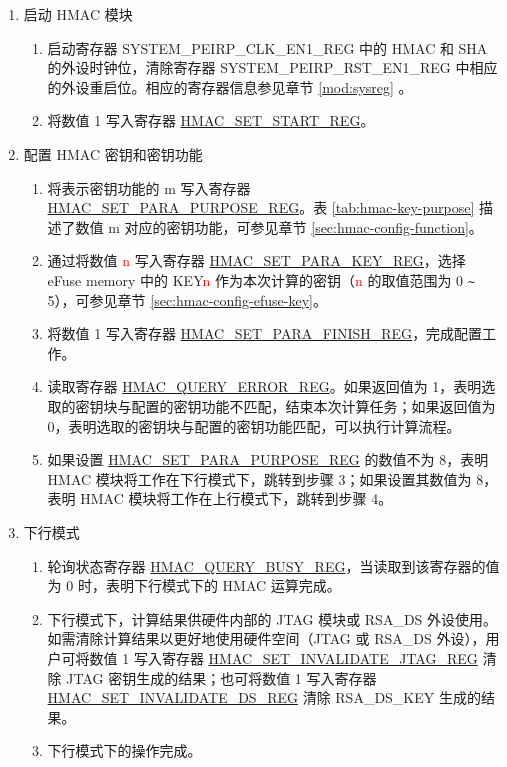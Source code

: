 \documentclass[main\_\_CN.tex]{subfiles}
\begin{document}
\begin{enumerate}
    \item 启动 HMAC 模块
    \begin{enumerate}
        \item 启动寄存器 SYSTEM\_PEIRP\_CLK\_EN1\_REG 中的 HMAC 和 SHA 的外设时钟位，清除寄存器 SYSTEM\_PEIRP\_RST\_EN1\_REG 中相应的外设重启位。相应的寄存器信息参见章节 \ref{mod:sysreg} \textit{}。
        \item 将数值 1 写入寄存器 \hyperref[regdesc:HMACSETSTARTREG]{HMAC\_SET\_START\_REG}。
    \end{enumerate}

    \item 配置 HMAC 密钥和密钥功能
        \begin{enumerate}
            \item 将表示密钥功能的 m 写入寄存器 \hyperref[regdesc:HMACSETPARAPURPOSEREG]{HMAC\_SET\_PARA\_PURPOSE\_REG}。表 \ref{tab:hmac-key-purpose} 描述了数值 m 对应的密钥功能，可参见章节 \ref{sec:hmac-config-function}。
            \item 通过将数值 \textcolor{red}{n} 写入寄存器 \hyperref[regdesc:HMACSETPARAKEYREG]{HMAC\_SET\_PARA\_KEY\_REG}，选择 eFuse memory 中的 KEY\textcolor{red}{n} 作为本次计算的密钥（\textcolor{red}{n} 的取值范围为 0 \verb+~+ 5），可参见章节 \ref{sec:hmac-config-efuse-key}。
            \item 将数值 1 写入寄存器 \hyperref[regdesc:HMACSETPARAFINISHREG]{HMAC\_SET\_PARA\_FINISH\_REG}，完成配置工作。
            \item 读取寄存器 \hyperref[regdesc:HMACQUERYERRORREG]{HMAC\_QUERY\_ERROR\_REG}。如果返回值为 1，表明选取的密钥块与配置的密钥功能不匹配，结束本次计算任务；如果返回值为 0，表明选取的密钥块与配置的密钥功能匹配，可以执行计算流程。
            \item 如果设置 \hyperref[regdesc:HMACSETPARAPURPOSEREG]{HMAC\_SET\_PARA\_PURPOSE\_REG} 的数值不为 8，表明 HMAC 模块将工作在下行模式下，跳转到步骤 3；如果设置其数值为 8，表明 HMAC 模块将工作在上行模式下，跳转到步骤 4。
        \end{enumerate}

    \item 下行模式
        \begin{enumerate}
            \item 轮询状态寄存器 \hyperref[regdesc:HMACQUERYBUSYREG]{HMAC\_QUERY\_BUSY\_REG}，当读取到该寄存器的值为 0 时，表明下行模式下的 HMAC 运算完成。
            \item 下行模式下，计算结果供硬件内部的 JTAG 模块或 RSA\_DS 外设使用。如需清除计算结果以更好地使用硬件空间（JTAG 或 RSA\_DS 外设），用户可将数值 1 写入寄存器 \hyperref[regdesc:HMACSETINVALIDATEJTAGREG]{HMAC\_SET\_INVALIDATE\_JTAG\_REG} 清除 JTAG 密钥生成的结果；也可将数值 1 写入寄存器 \hyperref[regdesc:HMACSETINVALIDATEDSREG]{HMAC\_SET\_INVALIDATE\_DS\_REG} 清除 RSA\_DS\_KEY 生成的结果。
            \item 下行模式下的操作完成。
        \end{enumerate}


\end{enumerate}
\end{document}
